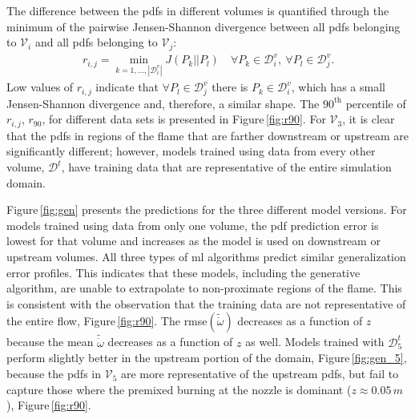 \documentclass[review]{elsarticle}
\newcommand{\wt}[1]{\widetilde{#1}}
\begin{document}
The difference between the \glspl{pdf} in different volumes is quantified
through the minimum of the pairwise Jensen-Shannon divergence between
all \glspl{pdf} belonging to $\mathcal{V}_i$ and all \glspl{pdf} belonging to
$\mathcal{V}_j$:
\begin{align}
  \label{eq:distance}
  r_{i,j} = \min_{k=1,\dots, |\mathcal{D}_i^v|} J( P_k || P_l )\quad \forall P_k \in \mathcal{D}_i^v,\ \forall P_l \in \mathcal{D}_j^v.
\end{align}
Low values of $r_{i,j}$ indicate that
$\forall P_l \in \mathcal{D}_j^v$ there is $P_k \in \mathcal{D}_i^v$,
which has a small Jensen-Shannon divergence and, therefore, a similar
shape. The $90^{\text{th}}$ percentile of $r_{i,j}$, $r_{90}$, for
different data sets is presented in Figure\,\ref{fig:r90}. For
$\mathcal{V}_3$, it is clear that the \glspl{pdf} in regions of the flame
that are farther downstream or upstream are significantly
different; however, models trained using data from every other volume,
$\mathcal{D}^t$, have training data that are representative of the
entire simulation domain.

Figure\,\ref{fig:gen} presents the predictions for the three different
model versions. For models trained using data from only one volume,
the \gls{pdf} prediction error is lowest for that volume and increases as
the model is used on downstream or upstream volumes.  All three types
of \gls{ml} algorithms predict similar generalization error
profiles. This indicates that these models, including the generative
algorithm, are unable to extrapolate to non-proximate regions of the
flame. This is consistent with the observation that the training data
are not representative of the entire flow, Figure\,\ref{fig:r90}. The
\gls{rmse}$(\wt{\dot{\omega}})$ decreases as a function of $z$ because the
mean $\wt{\dot{\omega}}$ decreases as a function of $z$ as
well. Models trained with $\mathcal{D}_5^t$ perform slightly better in
the upstream portion of the domain, Figure\,\ref{fig:gen_5}, because
the \glspl{pdf} in $\mathcal{V}_5$ are more representative of the upstream
\glspl{pdf}, but fail to capture those where the premixed burning at the
nozzle is dominant ($z\approx 0.05\,\unit{m}$), Figure\,\ref{fig:r90}.
\end{document}
